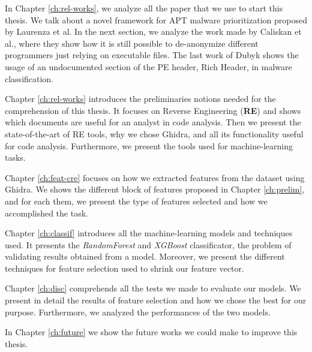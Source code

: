 In Chapter \ref{ch:rel-works}, we analyze all the paper that we use to start this thesis. We talk about a novel framework for APT malware prioritization proposed by Laurenza et al. In the next section, we analyze the work made by Caliskan et al., where they show how it is still possible to de-anonymize different programmers just relying on executable files. The last work of Dubyk shows the usage of an undocumented section of the PE header, Rich Header, in malware classification.

Chapter \ref{ch:rel-works} introduces the preliminaries notions needed for the comprehension of this thesis. It focuses on Reverse Engineering (\textbf{RE}) and shows which documents are useful for an analyst in code analysis. Then we present the state-of-the-art of RE tools, why we chose Ghidra, and all its functionality useful for code analysis. Furthermore, we present the tools used for machine-learning tasks.

Chapter \ref{ch:feat-cre} focuses on how we extracted features from the dataset using Ghidra. We shows the different block of features proposed in Chapter \ref{ch:prelim}, and for each them, we present the type of features selected and how we accomplished the task.

Chapter \ref{ch:classif} introduces all the machine-learning models and techniques used. It presents the \textit{RandomForest} and \textit{XGBoost} classificator, the problem of validating results obtained from a model. Moreover, we present the different techniques for feature selection used to shrink our feature vector.

Chapter \ref{ch:disc} comprehends all the tests we made to evaluate our models. We present in detail the results of feature selection and how we chose the best for our purpose.
Furthermore, we analyzed the performances of the two models.

In Chapter \ref{ch:future} we show the future works we could make to improve this thesis. 